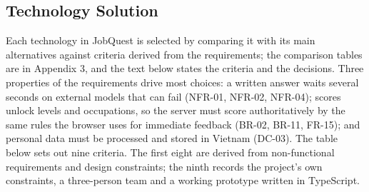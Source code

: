\subsection{Technology Solution}

Each technology in JobQuest is selected by comparing it with its main alternatives against criteria derived from the requirements; the comparison tables are in Appendix 3, and the text below states the criteria and the decisions. Three properties of the requirements drive most choices: a written answer waits several seconds on external models that can fail (NFR-01, NFR-02, NFR-04); scores unlock levels and occupations, so the server must score authoritatively by the same rules the browser uses for immediate feedback (BR-02, BR-11, FR-15); and personal data must be processed and stored in Vietnam (DC-03). The table below sets out nine criteria. The first eight are derived from non-\allowbreak{}functional requirements and design constraints; the ninth records the project's own constraints, a three-\allowbreak{}person team and a working prototype written in TypeScript.

